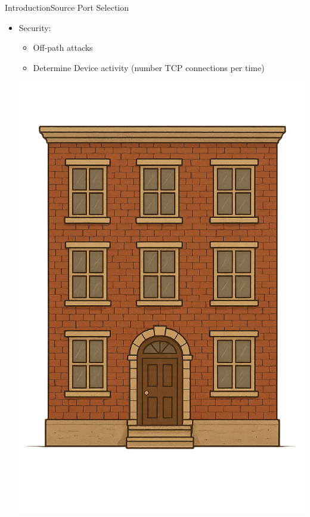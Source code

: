 \documentclass[aspectratio=169, hyperref={colorlinks=true, allcolors=SecondaryColor}, c]{beamer}
\begin{document}
	\begin{frame}[fragile]{Introduction}{Source Port Selection}
		\begin{itemize}
			\item \alert{Security:}
			\begin{itemize}
				\item \alert{Off-path attacks} %
				\item Determine \alert{Device activity (number TCP connections per time)} %
			\end{itemize}
			\begin{transformation}[0.2][0.6][0.2]
				\includegraphics[width=\textwidth]{./figures/apartment1.png}

\end{transformation}
\end{itemize}
\end{frame}
\end{document}
